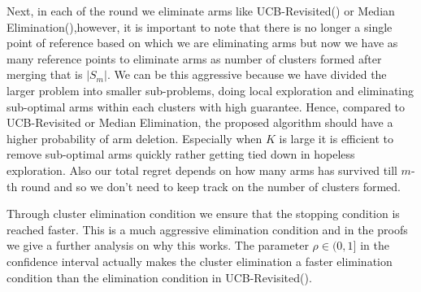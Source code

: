 	Next, in each of the round we eliminate arms like UCB-Revisited(\cite{auer2010ucb}) or Median Elimination(\cite{even2006action}),however, it is important to note that there is no longer a single point of reference based on which we are eliminating arms but now we have as many reference points to eliminate arms as number of clusters formed after merging that is $|S_{m}|$. We can be this aggressive because we have divided the larger problem into smaller sub-problems, doing local exploration and eliminating sub-optimal arms within each clusters with high guarantee. Hence, compared to UCB-Revisited or Median Elimination, the proposed algorithm should have a higher probability of arm deletion. Especially when $K$ is large it is efficient to remove sub-optimal arms quickly rather getting tied down in hopeless exploration. Also our total regret depends on how many arms has survived till $m$-th round and so we don't need to keep track on the number of clusters formed.

	Through cluster elimination condition we ensure that the stopping condition is reached faster. This is a much aggressive elimination condition and in the proofs we give a further analysis on why this works. The parameter $\rho\in (0,1]$ in the confidence interval actually makes the cluster elimination a faster elimination condition than the elimination condition in UCB-Revisited(\cite{auer2010ucb}).
	
